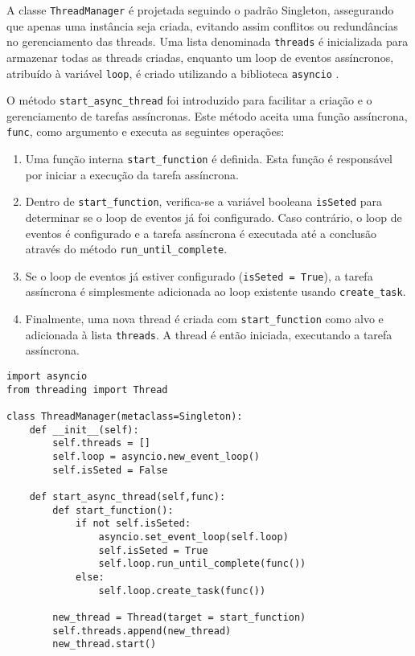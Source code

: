 A classe \texttt{ThreadManager} é projetada seguindo o padrão Singleton, assegurando que apenas uma instância seja criada, evitando assim conflitos ou redundâncias no gerenciamento das threads. Uma lista denominada \texttt{threads} é inicializada para armazenar todas as threads criadas, enquanto um loop de eventos assíncronos, atribuído à variável \texttt{loop}, é criado utilizando a biblioteca \texttt{asyncio} \cite{pythonAsyncio}.

O método \texttt{start\_async\_thread} foi introduzido para facilitar a criação e o gerenciamento de tarefas assíncronas. Este método aceita uma função assíncrona, \texttt{func}, como argumento e executa as seguintes operações:

\begin{enumerate}
    \item Uma função interna \texttt{start\_function} é definida. Esta função é responsável por iniciar a execução da tarefa assíncrona.
    \item Dentro de \texttt{start\_function}, verifica-se a variável booleana \texttt{isSeted} para determinar se o loop de eventos já foi configurado. Caso contrário, o loop de eventos é configurado e a tarefa assíncrona é executada até a conclusão através do método \texttt{run\_until\_complete}.
    \item Se o loop de eventos já estiver configurado (\texttt{isSeted = True}), a tarefa assíncrona é simplesmente adicionada ao loop existente usando \texttt{create\_task}.
    \item Finalmente, uma nova thread é criada com \texttt{start\_function} como alvo e adicionada à lista \texttt{threads}. A thread é então iniciada, executando a tarefa assíncrona.
\end{enumerate}

\begin{verbatim}
import asyncio
from threading import Thread

class ThreadManager(metaclass=Singleton):
    def __init__(self):
        self.threads = []
        self.loop = asyncio.new_event_loop()
        self.isSeted = False

    def start_async_thread(self,func):
        def start_function():
            if not self.isSeted:
                asyncio.set_event_loop(self.loop)
                self.isSeted = True
                self.loop.run_until_complete(func())
            else:
                self.loop.create_task(func())

        new_thread = Thread(target = start_function)
        self.threads.append(new_thread)
        new_thread.start()
\end{verbatim}

